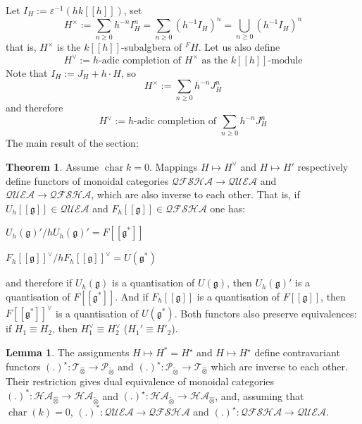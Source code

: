 \documentclass[8pt]{article}
\theoremstyle{definition}
\theoremstyle{definition}
\newtheorem{theorem}{Theorem}[section]
\theoremstyle{definition}
\theoremstyle{definition}
\theoremstyle{definition}
\theoremstyle{definition}
\theoremstyle{definition}
\theoremstyle{definition}
\newtheorem{lemma}{Lemma}[section]
\theoremstyle{definition}
\theoremstyle{definition}
\theoremstyle{definition}
\theoremstyle{definition}
\theoremstyle{definition}
\theoremstyle{definition}
\theoremstyle{question}
\newcommand{\tildetimes}[0]{\widetilde{\otimes}}
\begin{document}
  Let $I_H := \varepsilon^{-1}(h k [[h]])$, set
  \[
  H^{\times} := \sum \limits_{n \geq 0} h^{-n} I^{n}_H = \sum \limits_{n \geq 0} (h^{-1} I_H)^n = \bigcup \limits_{n \geq 0} (h^{-1} I_H)^n
  \]
  that is, $H^{\times}$ is the $k[[h]]$-subalgbera of ${}^F H$. Let us also define 
  \[
  H^{\vee} := \text{$h$-adic completion of $H^{\times}$ as the $k[[h]]$-module}
  \]
  Note that $I_H := J_H + h \cdot H$, so
  \[
  H^{\times} := \sum \limits_{n \geq 0} h^{-n} J^n_H
  \]
  and therefore
  \[
  H^{\vee} := \text{$h$-adic completion of $\sum \limits_{n \geq 0} h^{-n} J^n_H$}
  \]
  The main result of the section:
  \begin{theorem}
    Assume $\operatorname{char} k = 0$. Mappings $H \mapsto H^{\vee}$ and $H \mapsto H'$ respectively
    define functors of monoidal categories $\mathcal{QFSHA} \to \mathcal{QUEA}$ and $\mathcal{QUEA} \to \mathcal{QFSHA}$,
    which are also inverse to each other. That is, if $U_h[[\mathfrak{g}]] \in \mathcal{QUEA}$ and $F_h[[\mathfrak{g}]] \in \mathcal{QFSHA}$
    one has:
    \begin{center}
      $U_h(\mathfrak{g})'/h U_h(\mathfrak{g})' = F[[\mathfrak{g}^*]]$

      $F_h[[\mathfrak{g}]]^{\vee} / h F_h [[\mathfrak{g}]]^{\vee} = U(\mathfrak{g}^*)$
    \end{center}
    and therefore if $U_h(\mathfrak{g})$ is a quantisation of $U(\mathfrak{g})$,
    then $U_h(\mathfrak{g})'$ is a quantisation of $F[[\mathfrak{g}^*]]$.
    And if $F_h[[\mathfrak{g}]]$ is a quantisation of $F[[\mathfrak{g}]]$,
    then $F[[\mathfrak{g}^*]]^{\vee}$ is a quantisation of $U(\mathfrak{g}^*)$.
    Both functors also preserve equivalences: if $H_1 \equiv H_2$, then $H_1^{\vee} \equiv H^{\vee}_2$ ($H_1' \equiv H'_2$).
  \end{theorem}

\begin{lemma}
  The assignments $H \mapsto H^* = H^{\star}$ and $H \mapsto H^{\star}$ define contravariant functors
  $(.)^{\star} : \mathcal{T}_{\widehat{\otimes}} \to \mathcal{P}_{\tildetimes}$ and
  $(.)^{\star} : \mathcal{P}_{\tildetimes} \to \mathcal{T}_{\widehat{\otimes}}$
  which are inverse to each other. Their restriction gives
  dual equivalence of monoidal categories $(.)^* : \mathcal{HA}_{\widehat{\otimes}} \to \mathcal{HA}_{\tildetimes}$
  and $(.)^{\star} : \mathcal{HA}_{\tildetimes} \to \mathcal{HA}_{\widehat{\otimes}}$, and,
  assuming that $\operatorname{char}(k) = 0$, $(.)^* : \mathcal{QUEA} \to \mathcal{QFSHA}$
  and $(.)^{\star} : \mathcal{QFSHA} \to \mathcal{QUEA}$.
\end{lemma}
\end{document}
